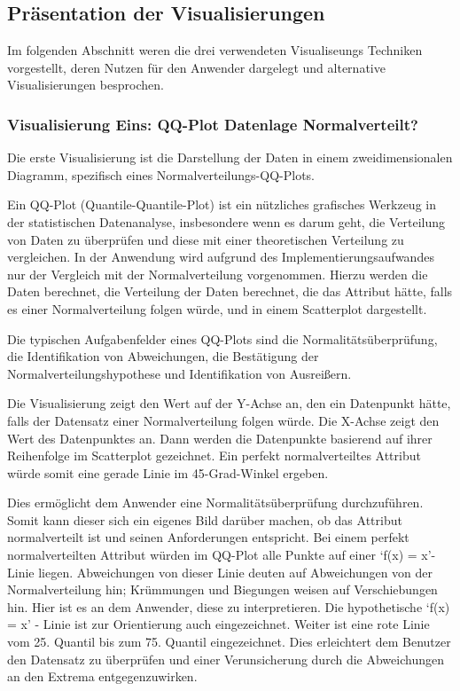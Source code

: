 \documentclass[usegeometry=true]{scrartcl}
\begin{document}
\subsection{Präsentation der Visualisierungen}

Im folgenden Abschnitt weren die drei verwendeten Visualiseungs Techniken vorgestellt, deren Nutzen für den Anwender dargelegt und alternative Visualisierungen besprochen.

\subsubsection{Visualisierung Eins: QQ-Plot Datenlage Normalverteilt?}

Die erste Visualisierung ist die Darstellung der Daten in einem zweidimensionalen Diagramm, spezifisch eines Normalverteilungs-QQ-Plots.

Ein QQ-Plot (Quantile-Quantile-Plot) ist ein nützliches grafisches Werkzeug in der statistischen Datenanalyse, insbesondere wenn es darum geht, die Verteilung von Daten zu überprüfen und diese mit einer theoretischen Verteilung zu vergleichen. In der Anwendung wird aufgrund des Implementierungsaufwandes nur der Vergleich mit der Normalverteilung vorgenommen. Hierzu werden die Daten berechnet, die Verteilung der Daten berechnet, die das Attribut hätte, falls es einer Normalverteilung folgen würde, und in einem Scatterplot dargestellt.

Die typischen Aufgabenfelder eines QQ-Plots sind die Normalitätsüberprüfung, die Identifikation von Abweichungen, die Bestätigung der Normalverteilungshypothese und Identifikation von Ausreißern.

Die Visualisierung zeigt den Wert auf der Y-Achse an, den ein Datenpunkt hätte, falls der Datensatz einer Normalverteilung folgen würde. Die X-Achse zeigt den Wert des Datenpunktes an. Dann werden die Datenpunkte basierend auf ihrer Reihenfolge im Scatterplot gezeichnet. Ein perfekt normalverteiltes Attribut würde somit eine gerade Linie im 45-Grad-Winkel ergeben.

Dies ermöglicht dem Anwender eine Normalitätsüberprüfung durchzuführen. Somit kann dieser sich ein eigenes Bild darüber machen, ob das Attribut normalverteilt ist und seinen Anforderungen entspricht. Bei einem perfekt normalverteilten Attribut würden im QQ-Plot alle Punkte auf einer `f(x) = x'-Linie liegen. Abweichungen von dieser Linie deuten auf Abweichungen von der Normalverteilung hin; Krümmungen und Biegungen weisen auf Verschiebungen hin. Hier ist es an dem Anwender, diese zu interpretieren. Die hypothetische `f(x) = x' - Linie ist zur Orientierung auch eingezeichnet. Weiter ist eine rote Linie vom 25. Quantil bis zum 75. Quantil eingezeichnet. Dies erleichtert dem Benutzer den Datensatz zu überprüfen und einer Verunsicherung durch die Abweichungen an den Extrema entgegenzuwirken.
\end{document}
